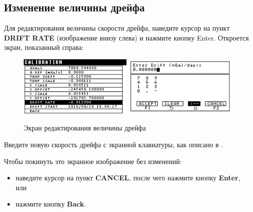 \subsection{Изменение величины дрейфа}



Для редактирования величины скорости дрейфа, наведите курсор на пункт
\textbf{DRIFT RATE} (изображение внизу слева) и нажмите кнопку Enter. Откроется
экран, показанный справа:

\newpage
\begin{figure}[H]
  \centering
  \includegraphics[width=0.49\textwidth]{figures/the_drift_rate_editing_screen_1}
  \includegraphics[width=0.49\textwidth]{figures/the_drift_rate_editing_screen_2}
  \caption{Экран редактирования величины дрейфа}
  \label{fig:the_drift_rate_editing_screen}
\end{figure}

Введите новую скорость дрейфа с экранной клавиатуры, как описано в
.

Чтобы покинуть это экранное изображение без изменений:
\begin{itemize}
  \item наведите курсор на пункт \textbf{CANCEL}, после чего нажмите кнопку
    \textbf{Enter}, или

  \item нажмите кнопку \textbf{Back}.
\end{itemize}

